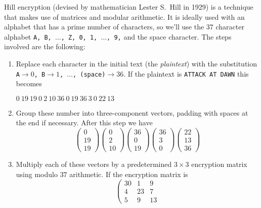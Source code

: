
Hill encryption (devised by mathematician Lester S.\ Hill in 1929) is a technique that makes use of matrices and modular arithmetic.  It is ideally used with an alphabet that has a prime number of characters, so we'll use the $37$ character alphabet {\tt A, B, $\ldots$, Z, 0, 1,
$\ldots$, 9,} and the space character.  The steps involved are the following:
\begin{enumerate}
\item Replace each character in the initial text (the {\em plaintext}) with the substitution {\tt A$\rightarrow 0$, B$\rightarrow 1$, $\ldots$, (space)$ \rightarrow 36$}.  If the plaintext is {\tt ATTACK AT DAWN} this becomes
\begin{center}
$0\ 19\ 19\ 0\ 2\ 10\ 36\ 0\ 19\ 36\ 3\ 0\ 22\ 13$
\end{center}
\item Group these number into three-component vectors, padding with spaces at the end if necessary.  After this step we have
\[
\left(
\begin{array}{c}
0 \\ 19 \\ 19
\end{array}
\right)
\left(
\begin{array}{c}
0 \\ 2 \\ 10
 \end{array}
\right)
\left(
\begin{array}{c}
36 \\ 0 \\ 19
\end{array}
\right)
\left(
\begin{array}{c}
36 \\ 3 \\ 0
\end{array}
\right)
\left(
\begin{array}{c}
22 \\ 13 \\ 36
\end{array}
\right)
\]
\item Multiply each of these vectors by a predetermined $3 \times 3$ encryption matrix using modulo $37$ arithmetic. If the encryption matrix is
\[
\left(
\begin{array}{ccc}
30 &  1 &  9 \\
 4 & 23 &  7 \\
 5 &  9 & 13
\end{array}
\]
\end{enumerate}
